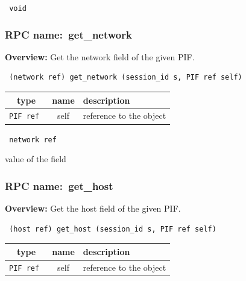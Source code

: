 \vspace{0.3cm}

{\tt 
void
}



\vspace{0.3cm}
\vspace{0.3cm}
\vspace{0.3cm}
\subsubsection{RPC name:~get\_network}

{\bf Overview:} 
Get the network field of the given PIF.

\begin{verbatim} (network ref) get_network (session_id s, PIF ref self)\end{verbatim}



 
\vspace{0.3cm}
\begin{tabular}{|c|c|p{7cm}|}
 \hline
{\bf type} & {\bf name} & {\bf description} \\ \hline
{\tt PIF ref } & self & reference to the object \\ \hline 

\end{tabular}

\vspace{0.3cm}

{\tt 
network ref
}


value of the field
\vspace{0.3cm}
\vspace{0.3cm}
\vspace{0.3cm}
\subsubsection{RPC name:~get\_host}

{\bf Overview:} 
Get the host field of the given PIF.

\begin{verbatim} (host ref) get_host (session_id s, PIF ref self)\end{verbatim}



 
\vspace{0.3cm}
\begin{tabular}{|c|c|p{7cm}|}
 \hline
{\bf type} & {\bf name} & {\bf description} \\ \hline
{\tt PIF ref } & self & reference to the object \\ \hline 

\end{tabular}

